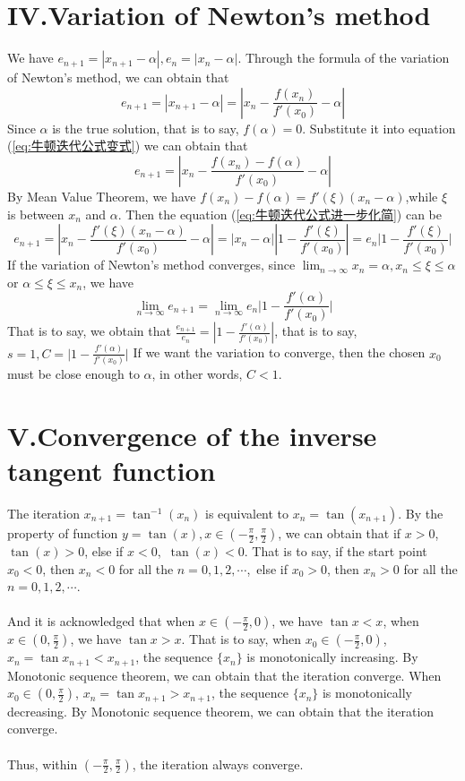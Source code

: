 \documentclass[a4paper]{article}
\begin{document}
\section*{IV.Variation of Newton's method}
We have $e_{n+1}=|x_{n+1}-\alpha|,e_n=|x_n-\alpha|$. Through the formula of the variation of Newton's method, we can obtain that
\begin{equation}
    e_{n+1}=|x_{n+1}-\alpha| = |x_n - \frac{f(x_n)}{f'(x_0)}-\alpha|  \label{eq:牛顿迭代公式变式}
\end{equation}
Since $\alpha$ is the true solution, that is to say, $f(\alpha)=0$. Substitute it into equation (\ref{eq:牛顿迭代公式变式}) we can obtain that 
\begin{equation}
    e_{n+1}=|x_n-\frac{f(x_n)-f(\alpha)}{f'(x_0)}-\alpha| \label{eq:牛顿迭代公式进一步化简}
\end{equation}
By Mean Value Theorem, we have $f(x_n)-f(\alpha)=f'(\xi)(x_n-\alpha)$,while $\xi$ is between $x_n$ and $\alpha$.
Then the equation (\ref{eq:牛顿迭代公式进一步化简}) can be
\begin{equation}
    e_{n+1}=|x_n-\frac{f'(\xi)(x_n-\alpha)}{f'(x_0)}-\alpha|=|x_n-\alpha||1-\frac{f'(\xi)}{f'(x_0)}|=e_n\big|1-\frac{f'(\xi)}{f'(x_0)}\big| \label{eq:误差关系}
\end{equation}
If the variation of Newton's method converges, since $\lim_{n\to\infty}x_n = \alpha,x_n\leq \xi\leq \alpha$ or $\alpha \leq \xi\leq x_n$, we have
\begin{equation}
    \lim_{n\to\infty} e_{n+1}=\lim_{n\to\infty}e_n\big|1-\frac{f'(\alpha)}{f'(x_0)}\big|
\end{equation}
That is to say, we obtain that $\frac{e_{n+1}}{e_n}=|1-\frac{f'(\alpha)}{f'(x_0)}|$, that is to say, $s=1,C=\big|1-\frac{f'(\alpha)}{f'(x_0)}\big|$
If we want the variation to converge, then the chosen $x_0$ must be close enough to $\alpha$, in other words, $C<1$.
\section*{V.Convergence of the inverse tangent function}

The iteration $x_{n+1}=\tan^{-1}(x_n)$ is equivalent to $x_n=\tan(x_{n+1})$. By the property of function $y=\tan(x),x\in(-\frac{\pi}{2},\frac{\pi}{2})$, we can obtain that if $x>0$,\ $\tan(x)>0$, else if $x<0$,\ $\tan(x)<0$. That is to say, if the start point $x_0<0$, then $x_n<0$ for all the $n=0,1,2,\cdots$,\ else if $x_0>0$, then $x_n>0$ for all the $n=0,1,2,\cdots$. \\
\\
And it is acknowledged that when $x\in(-\frac{\pi}{2},0)$, we have $\tan x <x$, when $x\in(0,\frac{\pi}{2})$, we have $\tan x >x$. That is to say, when $x_0\in (-\frac{\pi}{2},0)$, $x_n=\tan x_{n+1}<x_{n+1}$, the sequence $\{x_n\}$ is monotonically increasing. By Monotonic sequence theorem, we can obtain that the iteration converge. When $x_0\in (0,\frac{\pi}{2})$, $x_{n}=\tan x_{n+1}>x_{n+1}$, the sequence $\{x_n\}$ is monotonically decreasing. By Monotonic sequence theorem, we can obtain that the iteration converge.\\
\\
Thus, within $(-\frac{\pi}{2},\frac{\pi}{2})$, the iteration always converge.
\end{document}
